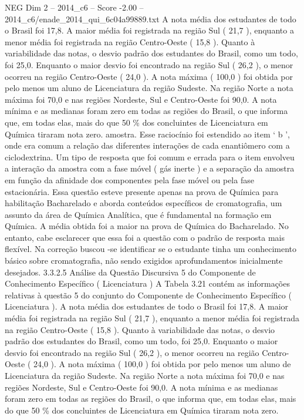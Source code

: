 \begin{textsample}{NEG Dim 2 – 2014\_c6 – Score -2.00 – 2014\_c6/enade\_2014\_qui\_6c04a99889.txt}
A nota média dos estudantes de todo o Brasil foi 17,8.
A maior média foi registrada na região Sul ( 21,7 ), enquanto a menor média foi registrada na região Centro-Oeste ( 15,8 ).
Quanto à variabilidade das notas, o desvio padrão dos estudantes do Brasil, como um todo, foi 25,0.
Enquanto o maior desvio foi encontrado na região Sul ( 26,2 ), o menor ocorreu na região Centro-Oeste ( 24,0 ).
A nota máxima ( 100,0 ) foi obtida por pelo menos um aluno de Licenciatura da região Sudeste.
Na região Norte a nota máxima foi 70,0 e nas regiões Nordeste, Sul e Centro-Oeste foi 90,0.
A nota mínima e as medianas foram zero em todas as regiões do Brasil, o que informa que, em todas elas, mais do que 50 \% dos concluintes de Licenciatura em Química tiraram nota zero. amostra.
Esse raciocínio foi estendido ao item ‘ b ’, onde era comum a relação das diferentes interações de cada enantiômero com a ciclodextrina.
Um tipo de resposta que foi comum e errada para o item envolveu a interação da amostra com a fase móvel ( gás inerte ) e a separação da amostra em função da afinidade dos componentes pela fase móvel ou pela fase estacionária.
Essa questão esteve presente apenas na prova de Química para habilitação Bacharelado e aborda conteúdos específicos de cromatografia, um assunto da área de Química Analítica, que é fundamental na formação em Química.
A média obtida foi a maior na prova de Química do Bacharelado.
No entanto, cabe esclarecer que essa foi a questão com o padrão de resposta mais flexível.
Na correção buscou -se identificar se o estudante tinha um conhecimento básico sobre cromatografia, não sendo exigidos aprofundamentos inicialmente desejados. 3.3.2.5 Análise da Questão Discursiva 5 do Componente de Conhecimento Específico ( Licenciatura ) A Tabela 3.21 contém as informações relativas à questão 5 do conjunto do Componente de Conhecimento Específico ( Licenciatura ).
A nota média dos estudantes de todo o Brasil foi 17,8.
A maior média foi registrada na região Sul ( 21,7 ), enquanto a menor média foi registrada na região Centro-Oeste ( 15,8 ).
Quanto à variabilidade das notas, o desvio padrão dos estudantes do Brasil, como um todo, foi 25,0.
Enquanto o maior desvio foi encontrado na região Sul ( 26,2 ), o menor ocorreu na região Centro-Oeste ( 24,0 ).
A nota máxima ( 100,0 ) foi obtida por pelo menos um aluno de Licenciatura da região Sudeste.
Na região Norte a nota máxima foi 70,0 e nas regiões Nordeste, Sul e Centro-Oeste foi 90,0.
A nota mínima e as medianas foram zero em todas as regiões do Brasil, o que informa que, em todas elas, mais do que 50 \% dos concluintes de Licenciatura em Química tiraram nota zero.

\end{textsample}
